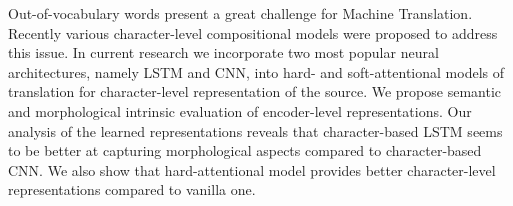 Out-of-vocabulary words present a great challenge for Machine Translation. Recently various character-level compositional models were proposed to address this issue. In current research we incorporate two most popular neural architectures, namely LSTM and CNN, into hard- and soft-attentional models of translation for character-level representation of the source. We propose semantic and morphological intrinsic evaluation of encoder-level representations. Our analysis of the learned representations reveals that character-based LSTM  seems to be better at capturing morphological aspects compared to character-based CNN. We also show that hard-attentional model provides better character-level representations compared to vanilla one.
